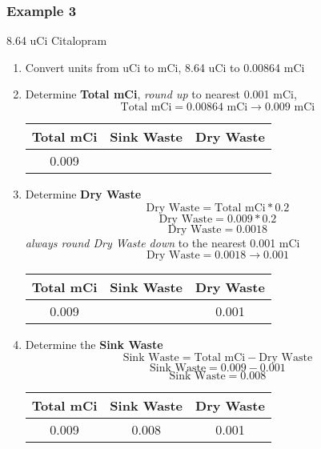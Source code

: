 \documentclass[12pt, letterpaper]{article}
\begin{document}
\FloatBarrier

\subsubsection{Example 3}
8.64 uCi Citalopram
\begin{enumerate}
    \item Convert units from uCi to mCi, 8.64 uCi to 0.00864 mCi
    \item Determine \textbf{Total mCi}, \emph{round up} to nearest 0.001 mCi,
    \[ \text{Total mCi} = 0.00864 \text{ mCi}  \rightarrow 0.009 \text{ mCi} \]
    \begin{table}[ht]
        \centering
        \begin{tabular}{|c|c|c|}
            \hline
            \textbf{Total mCi} & \textbf{Sink Waste} & \textbf{Dry Waste} \\
            \hline
            0.009 &  &  \\
            \hline
        \end{tabular}
    \end{table}
    \item Determine \textbf{Dry Waste}
    \[ \text{Dry Waste} = \text{Total mCi} * 0.2 \]
    \[ \text{Dry Waste} = 0.009 * 0.2 \]
    \[ \text{Dry Waste} = 0.0018 \]
    \emph{always round Dry Waste down} to the nearest 0.001 mCi
    \[ \text{Dry Waste} = 0.0018 \rightarrow 0.001 \]
    \begin{table}[ht]
        \centering
        \begin{tabular}{|c|c|c|}
            \hline
            \textbf{Total mCi} & \textbf{Sink Waste} & \textbf{Dry Waste} \\
            \hline
            0.009 & & 0.001 \\
            \hline
        \end{tabular}
    \end{table}
    \item Determine the \textbf{Sink Waste}
    \[ \text{Sink Waste} = \text{Total mCi} - \text{Dry Waste} \]
    \[ \text{Sink Waste} = 0.009 - 0.001 \]
    \[ \text{Sink Waste} = 0.008 \]
    \begin{table}[ht]
        \centering
        \begin{tabular}{|c|c|c|}
            \hline
            \textbf{Total mCi} & \textbf{Sink Waste} & \textbf{Dry Waste} \\
            \hline
            0.009 & 0.008 & 0.001 \\
            \hline
        \end{tabular}
    \end{table}
\end{enumerate}
\end{document}
